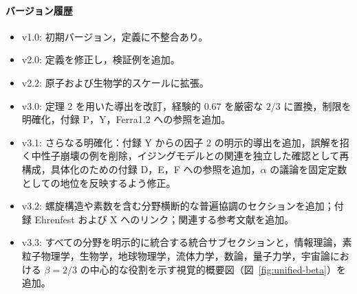 \documentclass[11pt,a4paper]{article}
\begin{document}
	\paragraph*{バージョン履歴}
	\begin{itemize}
		\item v1.0: 初期バージョン，定義に不整合あり。
		\item v2.0: 定義を修正し，検証例を追加。
		\item v2.2: 原子および生物学的スケールに拡張。
		\item v3.0: 定理 2 を用いた導出を改訂，経験的 \(0.67\) を厳密な \(2/3\) に置換，制限を明確化，付録 P，Y，Ferra1.2 への参照を追加。
		\item v3.1: さらなる明確化：付録 Y からの因子 2 の明示的導出を追加，誤解を招く中性子崩壊の例を削除，イジングモデルとの関連を独立した確認として再構成，具体化のための付録 D，E，F への参照を追加，\(\alpha\) の議論を固定定数としての地位を反映するよう修正。
		\item v3.2: 螺旋構造や素数を含む分野横断的な普遍協調のセクションを追加；付録 Ehrenfest および X へのリンク；関連する参考文献を追加。
		\item v3.3: すべての分野を明示的に統合する統合サブセクションと，情報理論，素粒子物理学，生物学，地球物理学，流体力学，数論，量子力学，宇宙論における \(\beta = 2/3\) の中心的な役割を示す視覚的概要図（図~\ref{fig:unified-beta}）を追加。
	\end{itemize}
	
\end{document}
